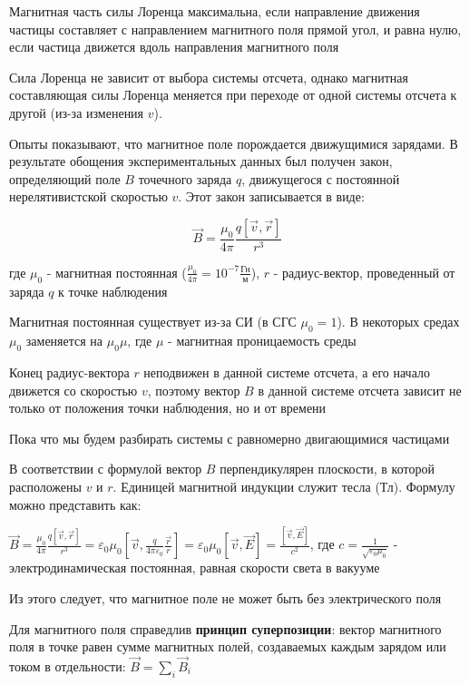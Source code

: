 \documentclass[12pt]{article}
\begin{document}
Магнитная часть силы Лоренца максимальна, если направление движения частицы составляет с направлением магнитного поля 
прямой угол, и равна нулю, если частица движется вдоль направления магнитного поля

Сила Лоренца не зависит от выбора системы отсчета, однако магнитная составляющая силы Лоренца меняется при переходе от одной
системы отсчета к другой (из-за изменения $v$).

Опыты показывают, что магнитное поле порождается движущимися зарядами. В результате обощения экспериментальных данных
был получен закон, определяющий поле $B$ точечного заряда $q$, движущегося с постоянной нерелятивистской скоростью $v$. 
Этот закон записывается в виде:

\[\vec{B} = \frac{\mu_0}{4\pi} \frac{q [\vec{v}, \vec{r}]}{r^3}\]

где $\mu_0$ - магнитная постоянная ($\frac{\mu_0}{4\pi} = 10^{-7} \frac{\text{Гн}}{\text{м}}$), $r$ - радиус-вектор, проведенный от заряда $q$ к точке наблюдения

Магнитная постоянная существует из-за СИ (в СГС $\mu_0 = 1$). В некоторых средах $\mu_0$ заменяется на $\mu_0 \mu$, где $\mu$ - магнитная проницаемость среды

\mediumvspace

Конец радиус-вектора $r$ неподвижен в данной системе отсчета, а его начало движется со скоростью $v$, поэтому
вектор $B$ в данной системе отсчета зависит не только от положения точки наблюдения, но и от времени

Пока что мы будем разбирать системы с равномерно двигающимися частицами

В соответствии с формулой вектор $B$ перпендикулярен плоскости, в которой расположены $v$ и $r$.
Единицей магнитной индукции служит тесла (Тл). Формулу можно представить как:

$\vec{B} = \frac{\mu_0}{4\pi} \frac{q [\vec{v}, \vec{r}]}{r^3} = \varepsilon_0 \mu_0 \left[\vec{v}, \frac{q}{4\pi\varepsilon_0} \frac{\vec{r}}{r}\right] = 
\varepsilon_0 \mu_0 [\vec{v}, \vec{E}] = \frac{[\vec{v}, \vec{E}]}{c^2}$, где $c = \frac{1}{\sqrt{\varepsilon_0 \mu_0}}$ - электродинамическая постоянная, равная скорости света в вакууме

Из этого следует, что магнитное поле не может быть без электрического поля

\mediumvspace

Для магнитного поля справедлив \textbf{принцип суперпозиции}: вектор магнитного поля в точке равен сумме магнитных полей,
создаваемых каждым зарядом или током в отдельности: $\vec{B} = \sum_i \vec{B}_i$
\end{document}
